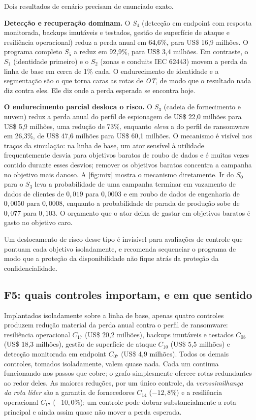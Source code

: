 Dois resultados de cenário precisam de enunciado exato.

\textbf{Detecção e recuperação dominam.} O $S_4$ (detecção em endpoint com resposta monitorada, backups imutáveis e
testados, gestão de superfície de ataque e resiliência operacional) reduz a
perda anual em 64,6\%, para US\$
16,9 milhões. O programa completo $S_5$ a reduz em 92,9\%, para US\$ 3,4
milhões. Em contraste, o $S_1$ (identidade primeiro) e o $S_2$ (zonas e
conduits IEC 62443) movem a perda da linha de base em cerca de 1\% cada. O endurecimento de identidade e a segmentação são o que torna caras as rotas
de \emph{OT}, de modo que o resultado nada diz contra eles. Ele diz onde a
perda esperada se encontra hoje.

\textbf{O endurecimento parcial desloca o risco.} O $S_3$ (cadeia de
fornecimento e nuvem) reduz a perda anual do perfil de espionagem de US\$ 22,0
milhões para US\$ 5,9 milhões, uma redução de 73\%, enquanto \emph{eleva} a do perfil de ransomware em 26,3\%, de US\$ 47,6 milhões para
US\$ 60,1 milhões. O mecanismo é visível nos traços da simulação: na linha de
base, um ator sensível à utilidade frequentemente desvia para objetivos baratos
de roubo de dados e é muitas vezes contido durante esses desvios; remover os
objetivos baratos concentra a campanha no objetivo mais danoso. A \cref{fig:mix} mostra o mecanismo diretamente. Ir do $S_0$ para o $S_3$ leva a
probabilidade de uma campanha terminar em vazamento de dados de clientes de
$0{,}019$ para $0{,}0003$ e em roubo de dados de engenharia de $0{,}0050$ para
$0{,}0008$, enquanto a probabilidade de parada de produção sobe de $0{,}077$
para $0{,}103$. O orçamento que o ator deixa de gastar em objetivos baratos é
gasto no objetivo caro.



Um deslocamento de risco desse tipo é invisível para avaliações de controle que
pontuam cada objetivo isoladamente, e recomenda sequenciar o programa de modo
que a proteção da disponibilidade não fique atrás da proteção da
confidencialidade.



\subsection{F5: quais controles importam, e em que sentido}

Implantados isoladamente sobre a linha de base, apenas quatro controles
produzem redução material da perda anual contra o perfil de ransomware:
resiliência operacional $C_{17}$ (US\$ 20,2 milhões), backups imutáveis e
testados $C_{08}$ (US\$ 18,3 milhões), gestão de superfície de ataque $C_{10}$
(US\$ 5,5 milhões) e detecção monitorada em endpoint $C_{07}$ (US\$ 4,9
milhões). Todos os demais controles, tomados isoladamente, valem quase nada. Cada um continua funcionando nos passos que cobre; o grafo
simplesmente oferece rotas redundantes ao redor deles. As maiores reduções, por um único controle,
da \emph{verossimilhança da rota líder} são a garantia de fornecedores $C_{14}$
($-12{,}8\%$) e a resiliência operacional $C_{17}$ ($-10{,}0\%$); um controle
pode dobrar substancialmente a rota principal e ainda assim quase não mover a
perda esperada.

